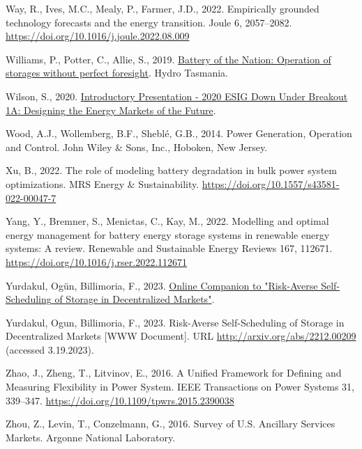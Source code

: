 \documentclass[12pt,a4paper,]{report}
\newlength{\cslhangindent}
\newenvironment{CSLReferences}[2] %
 {%
  \setlength{\parindent}{0pt}
  \ifodd #1 \everypar{\setlength{\hangindent}{\cslhangindent}}\ignorespaces\fi
  \ifnum #2 > 0
  \setlength{\parskip}{#2\baselineskip}
  \fi
 }%
 {}
\begin{document}
\begin{CSLReferences}{1}{0}
\leavevmode{}%
Way, R., Ives, M.C., Mealy, P., Farmer, J.D., 2022. Empirically grounded
technology forecasts and the energy transition. Joule 6, 2057--2082.
\url{https://doi.org/10.1016/j.joule.2022.08.009}

\leavevmode{}%
Williams, P., Potter, C., Allie, S., 2019.
\href{https://www.hydro.com.au/docs/default-source/clean-energy/battery-of-the-nation/storage-with-imperfect-foresight.pdf?sfvrsn=72e59528_4}{Battery
of the {Nation}: {Operation} of storages without perfect foresight}.
Hydro Tasmania.

\leavevmode{}%
Wilson, S., 2020.
\href{https://www.youtube.com/watch?v=LpYnKVC9hGY&feature=youtu.be}{Introductory
{Presentation} - 2020 {ESIG Down Under Breakout 1A}: {Designing} the
{Energy Markets} of the {Future}}.

\leavevmode{}%
Wood, A.J., Wollemberg, B.F., Sheblé, G.B., 2014. Power {Generation},
{Operation} and {Control}. John Wiley \& Sons, Inc., Hoboken, New
Jersey.

\leavevmode{}%
Xu, B., 2022. The role of modeling battery degradation in bulk power
system optimizations. MRS Energy \& Sustainability.
\url{https://doi.org/10.1557/s43581-022-00047-7}

\leavevmode{}%
Yang, Y., Bremner, S., Menictas, C., Kay, M., 2022. Modelling and
optimal energy management for battery energy storage systems in
renewable energy systems: {A} review. Renewable and Sustainable Energy
Reviews 167, 112671. \url{https://doi.org/10.1016/j.rser.2022.112671}

\leavevmode{}%
Yurdakul, Ogün, Billimoria, F., 2023.
\href{https://github.com/oyurdakul/pesgm23}{Online {Companion} to
"{Risk-Averse Self-Scheduling} of {Storage} in {Decentralized
Markets}"}.

\leavevmode{}%
Yurdakul, Ogun, Billimoria, F., 2023. Risk-{Averse Self-Scheduling} of
{Storage} in {Decentralized Markets} {[}WWW Document{]}. URL
\url{http://arxiv.org/abs/2212.00209} (accessed 3.19.2023).

\leavevmode{}%
Zhao, J., Zheng, T., Litvinov, E., 2016. A {Unified Framework} for
{Defining} and {Measuring Flexibility} in {Power System}. IEEE
Transactions on Power Systems 31, 339--347.
\url{https://doi.org/10.1109/tpwrs.2015.2390038}

\leavevmode{}%
Zhou, Z., Levin, T., Conzelmann, G., 2016. Survey of {U}.{S}. {Ancillary
Services Markets}. Argonne National Laboratory.

\end{CSLReferences}
\end{document}
